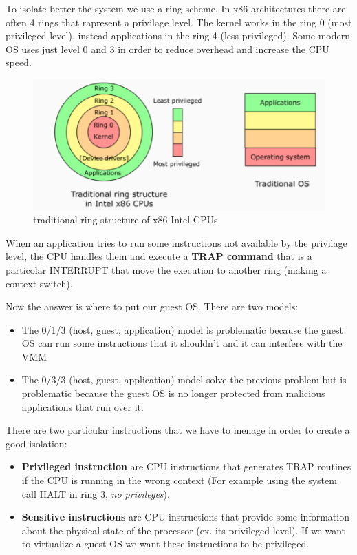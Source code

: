 To isolate better the system we use a ring scheme. In x86 architectures there are often 4 rings that rapresent a privilage level. The kernel works in the ring 0 (most privileged level), instead applications in the ring 4 (less privileged).
Some modern OS uses just level 0 and 3 in order to reduce overhead and increase the CPU speed.
\begin{figure}[h]
    \centering
    \includegraphics[scale=0.75]{images/rings.png}
    \caption{traditional ring structure of x86 Intel CPUs}
    \label{fig:ringstruct}
\end{figure}
When an application tries to run some instructions not available by the privilage level, the CPU handles them and execute a \textbf{TRAP command} that is a particolar INTERRUPT that move the execution to another ring (making a context switch).

Now the answer is where to put our guest OS.
There are two models:
\begin{itemize}
    \item The 0/1/3 (host, guest, application) model is problematic because the guest OS can run some instructions that it shouldn't and it can interfere with the VMM
    \item The 0/3/3 (host, guest, application) model solve the previous problem but is problematic because the guest OS is no longer protected from malicious applications that run over it.
\end{itemize}

There are two particular instructions that we have to menage in order to create a good isolation:
\begin{itemize}
    \item \textbf{Privileged instruction} are CPU instructions that generates TRAP routines if the CPU is running in the wrong context (For example using the system call HALT in ring 3, \textit{no privileges}).
    \item \textbf{Sensitive instructions} are CPU instructions that provide some information about the physical state of the processor (ex. its privileged level). If we want to virtualize a guest OS we want these instructions to be privileged.
\end{itemize}


